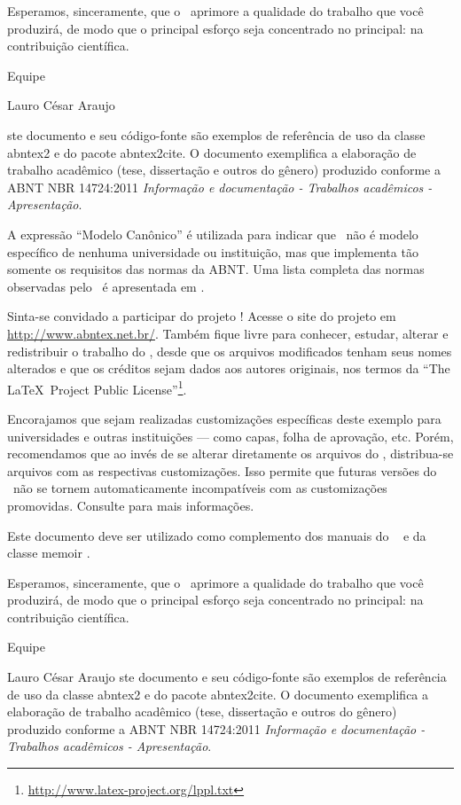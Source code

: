 \documentclass[
	12pt,				%
	openright,			%
	twoside,			%
	a4paper,			%
	english,			%
	french,				%
	spanish,			%
	brazil				%
	]{abntex2}
\begin{document}
Esperamos, sinceramente, que o \abnTeX\ aprimore a qualidade do trabalho que
você produzirá, de modo que o principal esforço seja concentrado no principal:
na contribuição científica.

Equipe \abnTeX 

Lauro César Araujo

ste documento e seu código-fonte são exemplos de referência de uso da classe
\textsf{abntex2} e do pacote \textsf{abntex2cite}. O documento 
exemplifica a elaboração de trabalho acadêmico (tese, dissertação e outros do
gênero) produzido conforme a ABNT NBR 14724:2011 \emph{Informação e documentação
- Trabalhos acadêmicos - Apresentação}.

A expressão ``Modelo Canônico'' é utilizada para indicar que \abnTeX\ não é
modelo específico de nenhuma universidade ou instituição, mas que implementa tão
somente os requisitos das normas da ABNT. Uma lista completa das normas
observadas pelo \abnTeX\ é apresentada em .

Sinta-se convidado a participar do projeto \abnTeX! Acesse o site do projeto em
\url{http://www.abntex.net.br/}. Também fique livre para conhecer,
estudar, alterar e redistribuir o trabalho do \abnTeX, desde que os arquivos
modificados tenham seus nomes alterados e que os créditos sejam dados aos
autores originais, nos termos da ``The \LaTeX\ Project Public
License''\footnote{\url{http://www.latex-project.org/lppl.txt}}.

Encorajamos que sejam realizadas customizações específicas deste exemplo para
universidades e outras instituições --- como capas, folha de aprovação, etc.
Porém, recomendamos que ao invés de se alterar diretamente os arquivos do
\abnTeX, distribua-se arquivos com as respectivas customizações.
Isso permite que futuras versões do \abnTeX~não se tornem automaticamente
incompatíveis com as customizações promovidas. Consulte
 para mais informações.

Este documento deve ser utilizado como complemento dos manuais do \abnTeX\ 
\cite{abntex2classe,abntex2cite,abntex2cite-alf} e da classe \textsf{memoir}
\cite{memoir}. 

Esperamos, sinceramente, que o \abnTeX\ aprimore a qualidade do trabalho que
você produzirá, de modo que o principal esforço seja concentrado no principal:
na contribuição científica.

Equipe \abnTeX 

Lauro César Araujo
ste documento e seu código-fonte são exemplos de referência de uso da classe
\textsf{abntex2} e do pacote \textsf{abntex2cite}. O documento 
exemplifica a elaboração de trabalho acadêmico (tese, dissertação e outros do
gênero) produzido conforme a ABNT NBR 14724:2011 \emph{Informação e documentação
- Trabalhos acadêmicos - Apresentação}.
\end{document}
